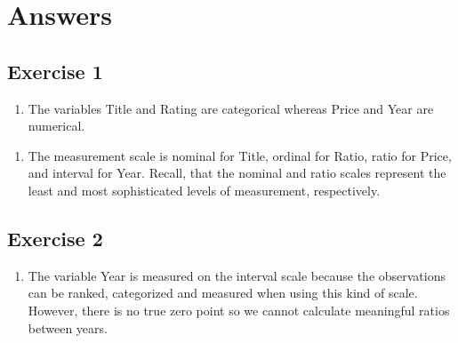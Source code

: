 \documentclass[
  letterpaper,
  DIV=11,
  numbers=noendperiod]{scrreprt}
\providecommand{\tightlist}{%
  \setlength{\itemsep}{0pt}\setlength{\parskip}{0pt}}\usepackage{longtable,booktabs,array}
\begin{document}
\hypertarget{answers}{%
\section{Answers}\label{answers}}

\hypertarget{exercise-1-1}{%
\subsection*{Exercise 1}\label{exercise-1-1}}

\begin{blackbox}

\begin{enumerate}
\def\labelenumi{\arabic{enumi}.}
\tightlist
\item
  The variables Title and Rating are categorical whereas Price and Year
  are numerical.
\end{enumerate}

\end{blackbox}

\begin{blackbox}

\begin{enumerate}
\def\labelenumi{\arabic{enumi}.}
\setcounter{enumi}{1}
\tightlist
\item
  The measurement scale is nominal for Title, ordinal for Ratio, ratio
  for Price, and interval for Year. Recall, that the nominal and ratio
  scales represent the least and most sophisticated levels of
  measurement, respectively.
\end{enumerate}

\end{blackbox}

\hypertarget{exercise-2-1}{%
\subsection*{Exercise 2}\label{exercise-2-1}}

\begin{blackbox}

\begin{enumerate}
\def\labelenumi{\arabic{enumi}.}
\tightlist
\item
  The variable Year is measured on the interval scale because the
  observations can be ranked, categorized and measured when using this
  kind of scale. However, there is no true zero point so we cannot
  calculate meaningful ratios between years.
\end{enumerate}

\end{blackbox}
\end{document}
